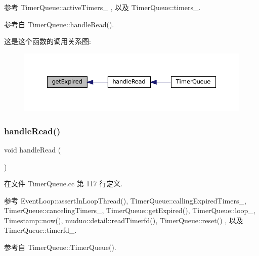 参考 Timer\+Queue\+::active\+Timers\+\_\+ , 以及 Timer\+Queue\+::timers\+\_\+.



参考自 Timer\+Queue\+::handle\+Read().

这是这个函数的调用关系图\+:
\nopagebreak
\begin{figure}[H]
\begin{center}
\leavevmode
\includegraphics[width=350pt]{classmuduo_1_1TimerQueue_a4475fc9e3cda425c7f71b9d3e00e840a_icgraph}
\end{center}
\end{figure}
\mbox{\label{classmuduo_1_1TimerQueue_a231ec0ec0313193a59b3f1326328ae50}} 
\subsubsection{\texorpdfstring{handle\+Read()}{handleRead()}}
{\footnotesize\ttfamily void handle\+Read (\begin{DoxyParamCaption}{ }\end{DoxyParamCaption})\hspace{0.3cm}{\ttfamily [private]}}



在文件 Timer\+Queue.\+cc 第 117 行定义.



参考 Event\+Loop\+::assert\+In\+Loop\+Thread(), Timer\+Queue\+::calling\+Expired\+Timers\+\_\+, Timer\+Queue\+::canceling\+Timers\+\_\+, Timer\+Queue\+::get\+Expired(), Timer\+Queue\+::loop\+\_\+, Timestamp\+::now(), muduo\+::detail\+::read\+Timerfd(), Timer\+Queue\+::reset() , 以及 Timer\+Queue\+::timerfd\+\_\+.



参考自 Timer\+Queue\+::\+Timer\+Queue().

